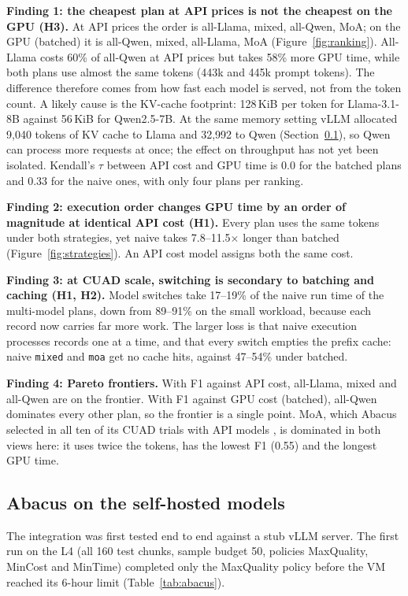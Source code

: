 \documentclass[11pt,a4paper]{article}
\newcommand{\code}[1]{\texttt{#1}}
\begin{document}
\textbf{Finding 1: the cheapest plan at API prices is not the cheapest on the GPU (H3).} At API
prices the order is all-Llama, mixed, all-Qwen, MoA; on the GPU (batched) it is all-Qwen, mixed,
all-Llama, MoA (Figure~\ref{fig:ranking}). All-Llama costs 60\% of all-Qwen at API prices but takes
58\% more GPU time, while both plans use almost the same tokens (443k and 445k prompt tokens). The
difference therefore comes from how fast each model is served, not from the token count. A likely
cause is the KV-cache footprint: 128\,KiB per token for Llama-3.1-8B against 56\,KiB for
Qwen2.5-7B. At the same memory setting vLLM allocated 9,040 tokens of KV cache to Llama and 32,992 to
Qwen (Section~\ref{sec:abacusres}), so Qwen can process more requests at once; the effect on
throughput has not yet been isolated. Kendall's $\tau$
between API cost and GPU time is 0.0 for the batched plans and 0.33 for the naive ones, with only four
plans per ranking.

\textbf{Finding 2: execution order changes GPU time by an order of magnitude at identical API cost
(H1).} Every plan uses the same tokens under both strategies, yet naive takes 7.8--11.5$\times$
longer than batched (Figure~\ref{fig:strategies}). An API cost model assigns both the same cost.

\textbf{Finding 3: at CUAD scale, switching is secondary to batching and caching (H1, H2).} Model
switches take 17--19\% of the naive run time of the multi-model plans, down from 89--91\% on the small
workload, because each record now carries far more work. The larger loss is that naive execution
processes records one at a time, and that every switch empties the prefix cache: naive \code{mixed}
and \code{moa} get no cache hits, against 47--54\% under batched.

\textbf{Finding 4: Pareto frontiers.} With F1 against API cost, all-Llama, mixed and all-Qwen are on
the frontier. With F1 against GPU cost (batched), all-Qwen dominates every other plan, so the
frontier is a single point. MoA, which Abacus selected in all ten of its CUAD trials with API models
\cite{russo2025abacus}, is dominated in both views here: it uses twice the tokens, has the lowest F1
(0.55) and the longest GPU time.

\subsection{Abacus on the self-hosted models}\label{sec:abacusres}

The integration was first tested end to end against a stub vLLM server. The first run on the L4
(all 160 test chunks, sample budget 50, policies MaxQuality, MinCost and MinTime) completed only the
MaxQuality policy before the VM reached its 6-hour limit (Table~\ref{tab:abacus}).
\end{document}
